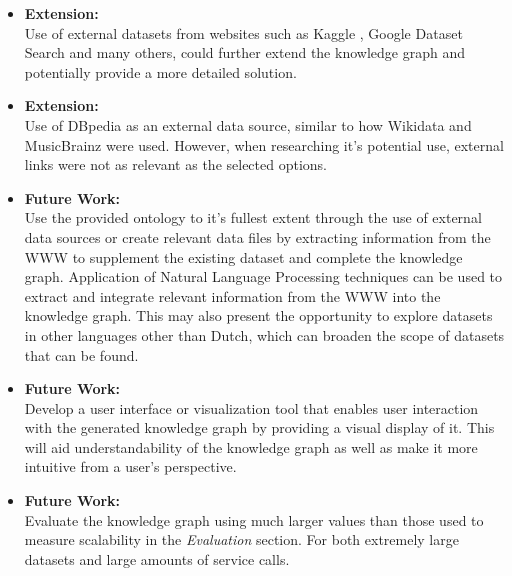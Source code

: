 \begin{itemize}
    \item \textbf{Extension:} \\ Use of external datasets from websites such as Kaggle \cite{kaggle}, Google Dataset Search \cite{googledatasetsearch} and many others, could further extend the knowledge graph and potentially provide a more detailed solution. 
    \item \textbf{Extension:} \\ Use of DBpedia \cite{organdbpedia} as an external data source, similar to how Wikidata and MusicBrainz were used. However, when researching it's potential use, external links were not as relevant as the selected options. 
    \item \textbf{Future Work:} \\ Use the provided ontology to it's fullest extent through the use of external data sources or create relevant data files by extracting information from the WWW to supplement the existing dataset and complete the knowledge graph. Application of Natural Language Processing techniques can be used to extract and integrate relevant information from the WWW into the knowledge graph. This may also present the opportunity to explore datasets in other languages other than Dutch, which can broaden the scope of datasets that can be found. 
    \item \textbf{Future Work:} \\ Develop a user interface or visualization tool that enables user interaction with the generated knowledge graph by providing a visual display of it. This will aid understandability of the knowledge graph as well as make it more intuitive from a user's perspective. 
    \item \textbf{Future Work:} \\ Evaluate the knowledge graph using much larger values than those used to measure scalability in the \textit{Evaluation} section. For both extremely large datasets and large amounts of service calls. 
\end{itemize}

